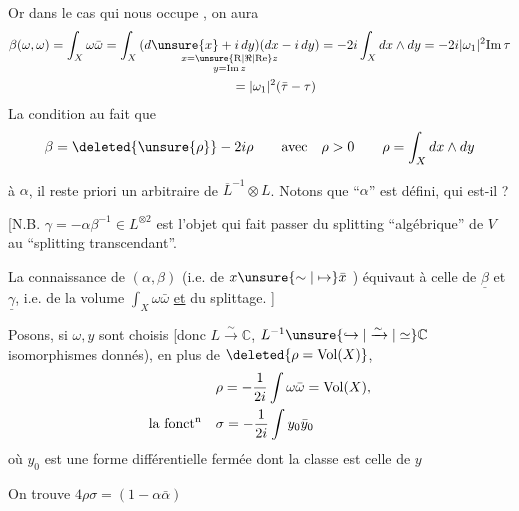 
Or dans le cas qui nous occupe , on aura
\[
\begin{aligned}
 \beta(\omega,\omega)
 &=\int_X\omega\bar\omega
 =\int_X\underset{\substack{x=\unsure{\mathrm R|\Re|\mathrm{Re}}z\\y=\mathrm{Im}\,z}}{(d\unsure{x}+i\,dy)(dx-i\,dy)}
 =-2i\int_Xdx\wedge dy=-2i\lvert\omega_1\rvert^2\mathrm{Im}\,\tau\\
 &\hphantom{{}=\int_X\omega\bar\omega\qquad\qquad\qquad\qquad\qquad}=\lvert\omega_1\rvert^2(\bar\tau-\tau)
\end{aligned}
\]
La condition   au fait que
\[
 \beta=\deleted{\unsure{\rho}}-2i\rho\qquad\text{avec}\quad\rho>0\qquad \rho=\int_X dx\wedge dy
\]

 à $\alpha$, il reste  priori un  arbitraire de $\overline L^{-1}\otimes L$. Notons que ``$\alpha$'' est défini,  qui est-il ?

[N.B. \quad $\gamma=-\alpha\beta^{-1}\in L^{\otimes2}$  est l'objet qui fait passer du splitting ``algébrique'' de $V$ au ``splitting transcendant''.

La connaissance de $(\alpha,\beta)$ (i.e. de $x\unsure{\mathrel{\sim}|\mapsto}\bar x$ ) équivaut à celle de $\underline\beta$ et $\underline\gamma$, i.e. de la volume $\int_X\omega\bar\omega$ \uline{et} du splittage. ]

Posons, si $\omega,y$ sont choisis [donc $L\xrightarrow{\sim}\mathbb C$, $L^{-1}\unsure{\hookrightarrow|\xrightarrow{\sim}|\simeq}\mathbb C$ isomorphismes donnés), en plus de $\deleted{\rho=\mathrm{Vol}(X)}$,
\[
\begin{aligned}
 &\rho=-\frac1{2i}\int\omega\bar\omega=\mathrm{Vol}(X),\\
 \text{la fonct\textsuperscript{n}}\quad &\sigma=-\frac1{2i}\int y_0\bar y_0
\end{aligned}
\]
où $y_0$ est une forme différentielle fermée dont la classe est celle de $y$

On trouve \qquad $4\rho\sigma=(1-\alpha\bar\alpha)$
